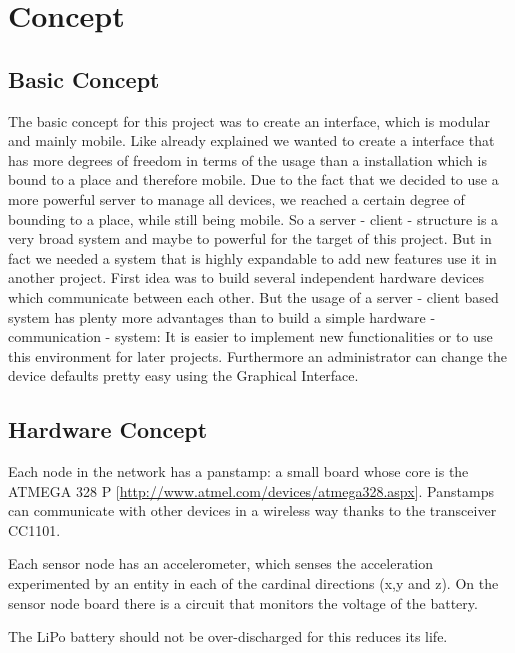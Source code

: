 \section{Concept}

\subsection{Basic Concept}

The basic concept for this project was to create an interface, which is modular and mainly mobile. Like already explained we wanted to create a interface that has more degrees of freedom in terms of the usage than a installation which is bound to a place and therefore mobile. Due to the fact that we decided to use a more powerful server to manage all devices, we reached a certain degree of bounding to a place, while still being mobile. 
So a server - client - structure is a very broad system and maybe to powerful for the target of this project. But in fact we needed a system that is highly expandable to add new features use it in another project.
First idea was to build several independent hardware devices which communicate between each other. But the usage of a server - client based system has plenty more advantages than to build a simple hardware - communication - system:
It is easier to implement new functionalities or to use this environment for later projects. Furthermore an administrator can change the device defaults pretty easy using the Graphical Interface.   

\subsection{Hardware Concept}
Each node in the network has a panstamp: a small board whose core is the ATMEGA 328 P [{\url{http://www.atmel.com/devices/atmega328.aspx}}].
Panstamps can communicate with other devices in a wireless way thanks to the transceiver CC1101. 



Each sensor node has an accelerometer, which senses the acceleration experimented by an entity in each of the cardinal directions (x,y and z).
On the sensor node board there is a circuit that monitors the voltage of the battery.
 
The LiPo battery should not be over-discharged for this reduces its life.
 
 
 


